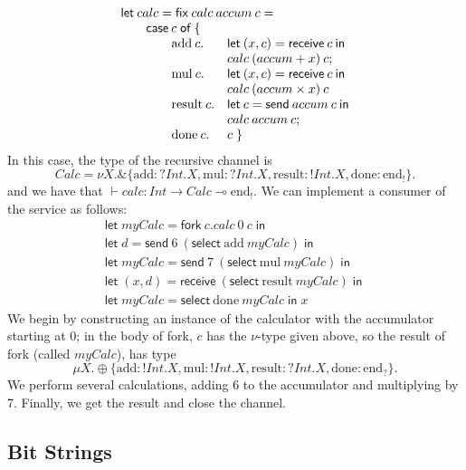 \documentclass[orivec,envcountsame]{llncs}
\newcommand{\with}{\mathbin\binampersand}
\newcommand{\gvout}[2]{{!#1.#2}}
\newcommand{\gvin}[2]{{?#1.#2}}
\newcommand{\lto}{\ensuremath{\multimap}}
\newcommand{\uto}{\ensuremath{\rightarrow}}
\newcommand{\outterm}{\mathrm{end}_!}
\newcommand{\interm}{\mathrm{end}_?}
\newcommand{\gvtyp}[3]{#1 \vdash #2 : #3}
\newcommand{\mkwd}[1]{\mathsf{#1}}
\newcommand{\tkwd}[1]{\textsf{#1}}
\newcommand{\clabel}[1]{\mathrm{#1}}
\newcommand{\gvsend}[2]{\mkwd{send}\:#1\:#2}
\newcommand{\gvreceive}[1]{\mkwd{receive}\:#1}
\newcommand{\gvlet}[3]{\mkwd{let}\;#1 = #2\;\mkwd{in}\;#3}
\newcommand{\gvselect}[2]{\mkwd{select}\:#1\:#2}
\newcommand{\gvfork}[2]{\mkwd{fork}\:#1.#2}
\newcommand{\lrkwd}{\mkwd{fix}}
\newcommand{\todo}[1]{{\noindent\small\color{red} \framebox{\parbox{\dimexpr\linewidth-2\fboxsep-2\fboxrule}{\textbf{TODO:} #1}}}}
\begin{document}
\[\begin{array}{llll}
 \mcl{4}{\mkwd{let}\:calc = \lrkwd\:calc\:accum\:c =} \\
 \quad & \mcl{3}{\mkwd{case}\:c\;\mkwd{of}\:\{} \\
 & \quad & \clabel{add}\:c. &\mkwd{let}\:(x,c) = \gvreceive{c} \: \mkwd{in} \\
 & & & calc\:(accum + x)\:c; \\
 & & \clabel{mul}\:c. &\mkwd{let}\:(x,c) = \gvreceive{c}\:\mkwd{in} \\
 & & & calc\:(accum \times x)\:c \\
 & & \clabel{result}\:c. &\mkwd{let}\:c = \gvsend{accum}{c}\:\mkwd{in} \\
 & & & calc\:accum\:c; \\
 & & \clabel{done}\:c.& c \; \}
\end{array}\]
In this case, the type of the recursive channel is
\[
 Calc = \nu X. \with \{ \clabel{add}: \gvin{Int}{X}, \clabel{mul}: \gvin{Int}{X}, \clabel{result}: \gvout{Int}{X}, \clabel{done}: \outterm \}.
\]
and we have that $\gvtyp{}{calc}{Int \uto Calc \lto \outterm}.$  We can implement a consumer of the service as
follows:
\[\begin{array}{l}
  \gvlet{myCalc}{\gvfork{c}{calc\:0\:c}}{} \\
  \gvlet{d}{\gvsend{6}{(\gvselect{\clabel{add}}{myCalc})}}{} \\
  \gvlet{myCalc}{\gvsend{7}{(\gvselect{\clabel{mul}}{myCalc})}}{} \\
  \gvlet{(x,d)}{\gvreceive{(\gvselect{\clabel{result}}{myCalc})}}{} \\
  \gvlet{myCalc}{\gvselect{\clabel{done}}{myCalc}}{x}
\end{array}\]
We begin by constructing an instance of the calculator with the accumulator starting at 0; in the
body of \tkwd{fork}, $c$ has the $\nu$-type given above, so the result of \tkwd{fork} (called
$myCalc$), has type
\[
\mu X. \oplus \{ \clabel{add}: \gvout{Int}{X}, \clabel{mul}: \gvout{Int}{X}, \clabel{result}: \gvin{Int}{X}, \clabel{done}: \interm \}.
\]
We perform several calculations, adding 6 to the accumulator and multiplying by 7.  Finally, we get
the result and close the channel.

\subsection{Bit Strings}
%
\end{document}
